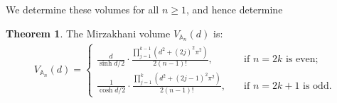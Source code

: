 \documentclass{amsart}
\theoremstyle{definition}
\newtheorem{theorem}[proposition]{Theorem}
\begin{document}
We determine these volumes for all $n\geq1$, and hence determine 

\begin{theorem}
\label{thm:fixedneckvol}
The Mirzakhani volume $V_{\mathbb{A}_n}(d)$ is:
\begin{align*}
V_{\mathbb{A}_n}(d) 
=
\left\{
\begin{array}{rl}
\frac{d}{\sinh{d/2}} \cdot 
\frac{\prod_{j=1}^{k-1} (d^2+(2j)^2\pi^2)}{2(n-1)!},
&\quad\text{if }n=2k\text{ is even;}
\\[0.25em]
\frac{1}{\cosh{d/2}} \cdot  \frac{\prod_{j=1}^{k} (d^2+(2j-1)^2\pi^2 )}{2(n-1)!},
&\quad\text{if }n = 2k+1\text{ is odd.}
\end{array}
\right.
\end{align*}

\end{theorem}
\end{document}
